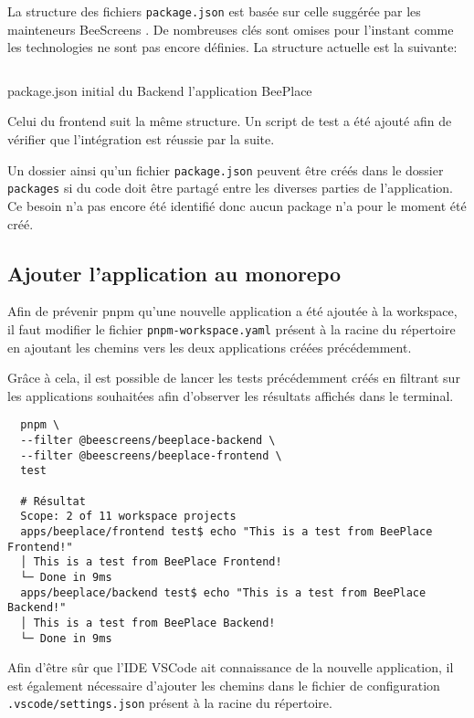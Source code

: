 La structure des fichiers \texttt{package.json} est basée sur celle suggérée par les mainteneurs BeeScreens \cite{aboutpnpmbeescreens}. De nombreuses clés sont omises pour l'instant comme les technologies ne sont pas encore définies. La structure actuelle est la suivante:

\begin{listing}[h]
  \inputminted{json}{assets/figures/package.json}
  \caption{package.json initial du Backend l'application BeePlace}
\end{listing}

Celui du frontend suit la même structure. Un script de test a été ajouté afin de vérifier que l'intégration est réussie par la suite.

Un dossier ainsi qu'un fichier \texttt{package.json} peuvent être créés dans le dossier \texttt{packages} si du code doit être partagé entre les diverses parties de l'application. Ce besoin n'a pas encore été identifié donc aucun package n'a pour le moment été créé.

\subsection{Ajouter l'application au monorepo}

Afin de prévenir pnpm qu'une nouvelle application a été ajoutée à la workspace, il faut modifier le fichier \texttt{pnpm-workspace.yaml} présent à la racine du répertoire en ajoutant les chemins vers les deux applications créées précédemment.


Grâce à cela, il est possible de lancer les tests précédemment créés en filtrant sur les applications souhaitées afin d'observer les résultats affichés dans le terminal.

\begin{verbatim}
  pnpm \
  --filter @beescreens/beeplace-backend \
  --filter @beescreens/beeplace-frontend \
  test

  # Résultat
  Scope: 2 of 11 workspace projects
  apps/beeplace/frontend test$ echo "This is a test from BeePlace Frontend!"
  │ This is a test from BeePlace Frontend!
  └─ Done in 9ms
  apps/beeplace/backend test$ echo "This is a test from BeePlace Backend!"
  │ This is a test from BeePlace Backend!
  └─ Done in 9ms
\end{verbatim}

Afin d'être sûr que l'IDE VSCode ait connaissance de la nouvelle application, il est également nécessaire d'ajouter les chemins dans le fichier de configuration \texttt{.vscode/settings.json} présent à la racine du répertoire.


